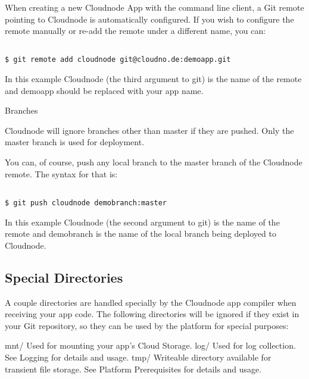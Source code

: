When creating a new Cloudnode App with the command line client, a Git remote pointing to Cloudnode is automatically configured. If you wish to configure the remote manually or re-add the remote under a different name, you can:

\begin{adjustwidth}{2.5em}{2.5em}
\begin{verbatim}

$ git remote add cloudnode git@cloudno.de:demoapp.git

\end{verbatim}
\end{adjustwidth}

In this example Cloudnode (the third argument to git) is the name of the remote and demoapp should be replaced with your app name.

Branches

Cloudnode will ignore branches other than master if they are pushed. Only the master branch is used for deployment.

You can, of course, push any local branch to the master branch of the Cloudnode remote. The syntax for that is:

\begin{adjustwidth}{2.5em}{2.5em}
\begin{verbatim}

$ git push cloudnode demobranch:master

\end{verbatim}
\end{adjustwidth}

In this example Cloudnode (the second argument to git) is the name of the remote and demobranch is the name of the local branch being deployed to Cloudnode.

\subsection{Special Directories}
\label{specialdirectories}

A couple directories are handled specially by the Cloudnode app compiler when receiving your app code. The following directories will be ignored if they exist in your Git repository, so they can be used by the platform for special purposes:

mnt\slash 
Used for mounting your app's Cloud Storage.
log\slash 
Used for log collection. See Logging for details and usage.
tmp\slash 
Writeable directory available for transient file storage. See Platform Prerequisites for details and usage.

